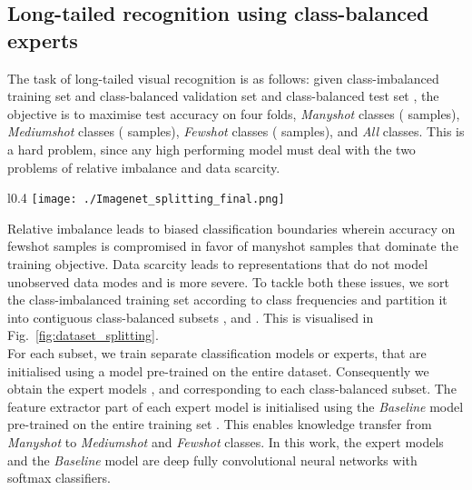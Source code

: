 \documentclass[runningheads]{llncs}
\begin{document}
\subsection{Long-tailed recognition using class-balanced experts}
\label{Long-tailed recognition using class-balanced experts}
The task of long-tailed visual recognition is as follows: given class-imbalanced training set  and class-balanced validation set  and class-balanced test set , the objective is to maximise test accuracy on four folds,
\emph{Manyshot} classes ( samples), \emph{Mediumshot} classes ( samples), \emph{Fewshot} classes ( samples), and \emph{All} classes. This is a hard problem, since any high performing model must deal with the two problems of relative imbalance and data scarcity. 

\begin{wrapfigure}{l}{0.4\linewidth}
        \vspace{-2em}
        \texttt{[image: ./Imagenet\_splitting\_final.png]}
        \vspace{-1em}
        \caption{Dataset splitting: We decompose ImageNet-LT into (relatively) class-balanced \emph{Manyshot}, \emph{Mediumshot}, and \emph{Fewshot} data subsets.}
        \vspace{-2em}
        \label{fig:dataset_splitting}
\end{wrapfigure}

Relative imbalance leads to biased classification boundaries wherein accuracy on fewshot samples is compromised in favor of manyshot samples that dominate the training objective. Data scarcity leads to representations that do not model unobserved data modes and is more severe. To tackle both these issues, we sort the class-imbalanced training set  according to class frequencies and partition it into contiguous class-balanced subsets ,  and . This is visualised in Fig.~\ref{fig:dataset_splitting}. \\ For each subset, we train separate classification models or experts, that are initialised using a model pre-trained on the entire dataset. 
 Consequently we obtain the expert models ,  and  corresponding to each class-balanced subset. The feature extractor part of each expert model  is initialised using the \emph{Baseline} model pre-trained on the entire training set . This enables knowledge transfer from \emph{Manyshot} to \emph{Mediumshot} and \emph{Fewshot} classes. In this work, the expert models  and the \emph{Baseline} model are deep fully convolutional neural networks with softmax classifiers.
\end{document}
